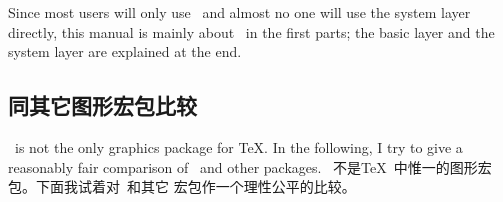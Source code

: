Since most users will only use \tikzname\ and almost no one will use
the system layer directly, this manual is mainly about \tikzname\ in
the first parts; the basic layer and the system layer are explained at
the end.


\subsection{同其它图形宏包比较}

\tikzname\ is not the only graphics package for \TeX. In the following,
I try to give a reasonably fair comparison of \tikzname\ and
other packages.
\tikzname\ 不是\TeX\ 中惟一的图形宏包。下面我试着对\tikzname\ 和其它
宏包作一个理性公平的比较。

